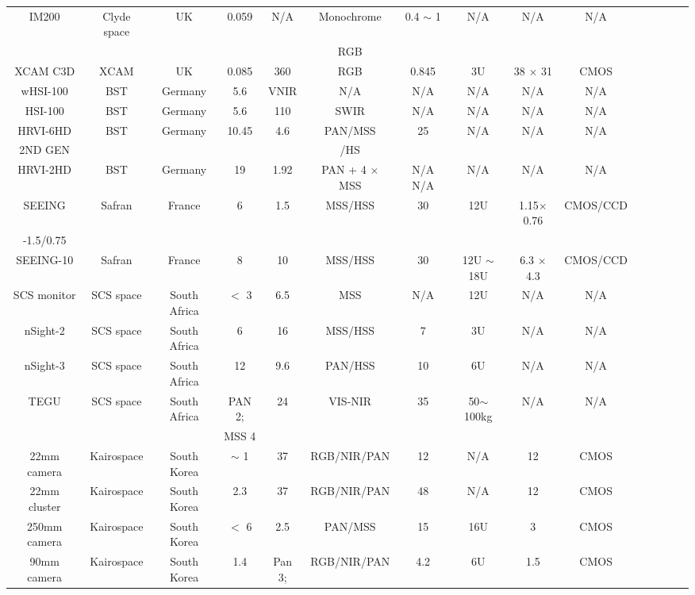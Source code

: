\documentclass[final,5p,times,twocolumn,authoryear]{elsarticle}
\begin{document}
\begin{table}
{\begin{tabular}{c c c c c c c c c c c c c c c}
			IM200 & Clyde space & UK & 0.059 & N/A & Monochrome & 0.4 $\sim$ 1 & N/A & N/A & N/A & \citep{clyde2023}\\
			& & & & &  RGB & & & & & & &  \\
			XCAM C3D & XCAM & UK & 0.085 & 360 & RGB & 0.845 & 3U & 38 $\times$ 31 & CMOS & \citep{casini2020towards, xcam2023}\\
			wHSI-100 & BST & Germany & 5.6 &  VNIR & N/A &N/A & N/A & N/A &  N/A &\citep{bst2023}\\
			HSI-100 & BST & Germany & 5.6 & 110 &SWIR & N/A & N/A & N/A & N/A & \citep{bst2023}\\
			HRVI-6HD & BST & Germany & 10.45 & 4.6 &  PAN/MSS & 25 &  N/A & N/A & N/A & \citep{bst2023}\\
			2ND GEN& & & & &  /HS & & & & & & &  \\
			HRVI-2HD & BST & Germany & 19 & 1.92 &  PAN + 4 $\times$ MSS & N/A  N/A & N/A & N/A & N/A &\citep{bst2023}\\
			SEEING & Safran & France & 6 & 1.5 &  MSS/HSS & 30 & 12U & 1.15$\times$0.76 & CMOS/CCD & \citep{safran2023}\\
			-1.5/0.75 & & & & & & & & & & & & &  \\
			SEEING-10 & Safran & France & 8 & 10 & MSS/HSS & 30 &  12U $\sim$ 18U & 6.3 $\times$ 4.3 & CMOS/CCD & \citep{safran2023}\\
			SCS monitor & SCS space & South Africa & $<$ 3 & 6.5 & MSS & N/A &  12U & N/A & N/A & \citep{scs2023}\\
			nSight-2 & SCS space & South Africa & 6 & 16 &  MSS/HSS & 7 & 3U & N/A & N/A & \cite{scs2023}\\
			nSight-3 & SCS space & South Africa & 12 & 9.6 &  PAN/HSS & 10 &  6U & N/A & N/A & \citep{scs2023}\\
			TEGU & SCS space & South Africa &  PAN 2; & 24 & VIS-NIR & 35 &  50$\sim$100kg & N/A & N/A & \citep{scs2023}\\
			& & & MSS 4 & &  & & & & & & &  \\
			22mm camera & Kairospace & South Korea & $\sim$ 1 & 37 & RGB/NIR/PAN & 12 &  N/A & 12 & CMOS & \citep{kairo2023} \\
			22mm cluster & Kairospace & South Korea & 2.3 & 37 &  RGB/NIR/PAN & 48 &  N/A & 12 & CMOS & \citep{kairo2023} \\
			250mm camera & Kairospace & South Korea & $<$ 6 & 2.5 & PAN/MSS & 15 &  16U & 3 & CMOS & \citep{kairo2023} \\
			90mm camera & Kairospace & South Korea & 1.4 & Pan 3; & RGB/NIR/PAN & 4.2 &  6U & 1.5 & CMOS & \citep{kairo2023} \\

\end{tabular}}
\end{table}
\end{document}
